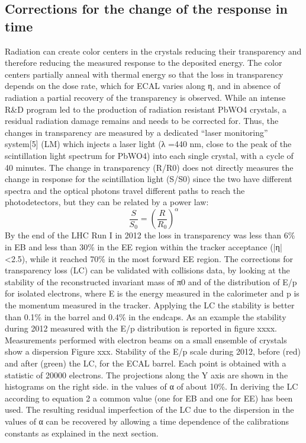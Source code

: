 \documentclass[journal]{IEEEtran}
\begin{document}
\subsection{Corrections for the change of the response in time}
Radiation can create color centers in the crystals reducing their transparency and therefore reducing the measured response to the deposited energy. The color centers partially anneal with thermal energy so that the loss in transparency depends on the dose rate, which for ECAL varies along η, and in absence of radiation a partial recovery of the transparency is observed.
While an intense R\&D program led to the production of radiation resistant PbWO4 crystals, a residual radiation damage remains and needs to be corrected for. Thus, the changes in transparency are measured by a dedicated “laser monitoring” system[5] (LM) which injects a laser light (λ =440 nm, close to the peak of the scintillation light spectrum for PbWO4) into each single crystal, with a cycle of 40 minutes. The change in transparency (R/R0) does not directly measures the change in response for the scintillation light (S/S0) since the two have different spectra and the optical photons travel different paths to reach the photodetectors, but they can be related by a power law:
\begin{equation}
\frac{S}{S_0} = \left(\frac{R}{R_0}\right)^\alpha
\end{equation}
By the end of the LHC Run I in 2012 the loss in transparency was less than 6\% in EB and less than 30\% in the EE region within the tracker acceptance (|η| <2.5), while it reached 70\% in the most forward EE region. The corrections for transparency loss (LC) can be validated with collisions data, by looking at the stability of the reconstructed invariant mass of π0 and of the distribution of E/p for isolated electrons, where E is the energy measured in the calorimeter and p is the momentum measured in the tracker.
Applying the LC the stability is better than 0.1\% in the barrel and 0.4\% in the endcaps. As an example the stability during 2012 measured with the E/p distribution is reported in figure xxxx.
Measurements performed with electron beams on a small ensemble of crystals show a dispersion
Figure xxx. Stability of the E/p scale during 2012, before (red) and after (green) the LC, for the ECAL barrel. Each point is obtained with a statistic of 20000 electrons. The projections along the Y axis are shown in the histograms on the right side.
in the values of α of about 10\%. In deriving the LC according to equation 2 a common value (one for EB and one for EE) has been used. The resulting residual imperfection of the LC due to the dispersion in the values of α can be recovered by allowing a time dependence of the calibrations constants as explained in the next section.
\end{document}
